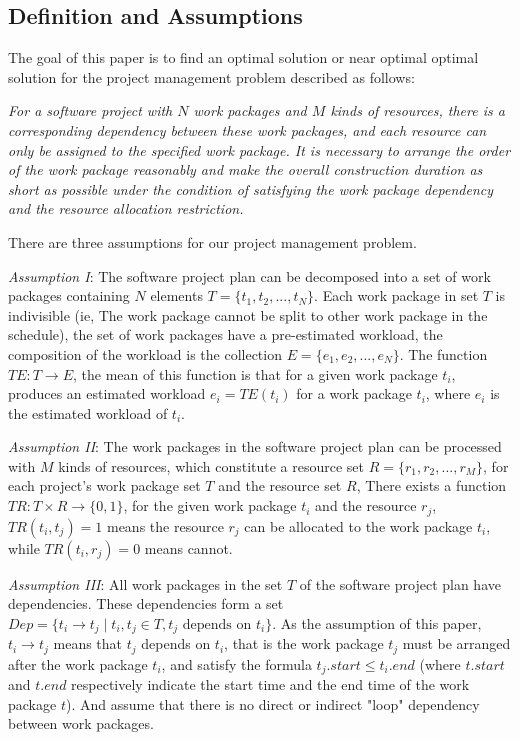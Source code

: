 \subsection{Definition and Assumptions}
%
The goal of this paper is to find an optimal solution or near optimal optimal
solution for the project management problem described as follows:


\emph{
  For a software project with $N$ work packages and $M$ kinds of resources,
  there is a corresponding dependency between these work packages, and each
  resource can only be assigned to the specified work package.  It is necessary
  to arrange the order of the work package reasonably and make the overall
  construction duration as short as possible under the condition of satisfying
  the work package dependency and the resource allocation restriction.
}

%
There are three assumptions for our project management problem.


\emph{Assumption I}: The software project plan can be decomposed into a set of
work packages containing $N$ elements $T = \{t_1, t_2, ..., t_N \}$.
Each work package in set $T$ is indivisible (ie, The work package cannot be
split to other work package in the schedule), the set of work packages have a
pre-estimated workload, the composition of the workload is the collection
$E = \{e _1, e_2, ..., e_N \}$. The function $TE: T \rightarrow E$,
the mean of this function is that for a given work package $t_i$, produces an
estimated workload $e_i = TE(t_i)$ for a work package $t_i$, where $e_i$ is the
estimated workload of $t_i$.


\emph{Assumption II}: The work packages in the software project plan can be
processed with $M$ kinds of resources, which constitute a resource set
$R = \{r_1, r_2, ..., r_M \}$, for each project's work package set $T$ and the
resource set $R$, There exists a function $TR: T \times R \rightarrow \{0, 1\}$,
for the given work package $t_i$ and the resource $r_j$, $TR(t_i, t_j) = 1$
means the resource $r_j$ can be allocated to the work package $t_i$, while
$TR(t_i, r_j) = 0$ means cannot.


\emph{Assumption III}: All work packages in the set $T$ of the software project
plan have dependencies. These dependencies form a set
$Dep= \{t_i \rightarrow t_j \mid t_i, t_j \in T, t_j \text{ depends on } t_i\}$.
As the assumption of this paper, $t_i \rightarrow t_j$ means that $t_j$ depends
on $t_i$, that is the work package $t_j$ must be arranged after the work
package $t_i$, and satisfy the formula $t_j.start \leq t_i.end$ (where $t.start$
and $t.end$ respectively indicate the start time and the end time of the work
package $t$).  And assume that there is no direct or indirect "loop" dependency
between work packages.



